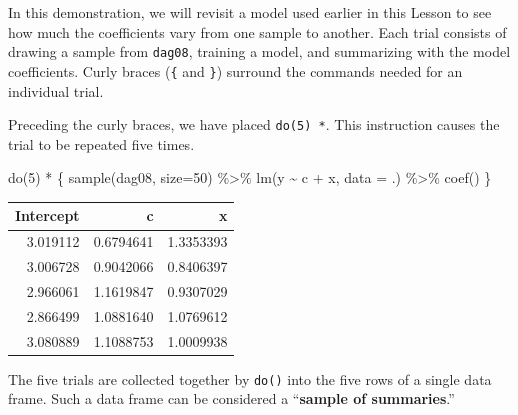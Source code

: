 \documentclass[
  letterpaper,
  DIV=11,
  numbers=noendperiod,
  oneside]{scrreprt}
\newenvironment{Shaded}{\begin{snugshade}}{\end{snugshade}}
\newcommand{\AttributeTok}[1]{\textcolor[rgb]{0.40,0.45,0.13}{#1}}
\newcommand{\DecValTok}[1]{\textcolor[rgb]{0.68,0.00,0.00}{#1}}
\newcommand{\FunctionTok}[1]{\textcolor[rgb]{0.28,0.35,0.67}{#1}}
\newcommand{\NormalTok}[1]{\textcolor[rgb]{0.00,0.23,0.31}{#1}}
\newcommand{\SpecialCharTok}[1]{\textcolor[rgb]{0.37,0.37,0.37}{#1}}
\begin{document}
\begin{tcolorbox}[enhanced jigsaw, colbacktitle=quarto-callout-warning-color!10!white, breakable, opacitybacktitle=0.6, colback=white, left=2mm, arc=.35mm, colframe=quarto-callout-warning-color-frame, coltitle=black, toprule=.15mm, opacityback=0, leftrule=.75mm, bottomtitle=1mm, toptitle=1mm, titlerule=0mm, title=\textcolor{quarto-callout-warning-color}{\faExclamationTriangle}\hspace{0.5em}{Demonstration: Conducting many trials with \texttt{do()}}, rightrule=.15mm, bottomrule=.15mm]

In this demonstration, we will revisit a model used earlier in this
Lesson to see how much the coefficients vary from one sample to another.
Each trial consists of drawing a sample from \texttt{dag08}, training a
model, and summarizing with the model coefficients. Curly braces
(\texttt{\{} and \texttt{\}}) surround the commands needed for an
individual trial.

Preceding the curly braces, we have placed \texttt{do(5)\ *}. This
instruction causes the trial to be repeated five times.

\begin{Shaded}
\begin{Highlighting}[]
\FunctionTok{do}\NormalTok{(}\DecValTok{5}\NormalTok{) }\SpecialCharTok{*}\NormalTok{ \{}
  \FunctionTok{sample}\NormalTok{(dag08, }\AttributeTok{size=}\DecValTok{50}\NormalTok{) }\SpecialCharTok{\%\textgreater{}\%} 
    \FunctionTok{lm}\NormalTok{(y }\SpecialCharTok{\textasciitilde{}}\NormalTok{ c }\SpecialCharTok{+}\NormalTok{ x, }\AttributeTok{data =}\NormalTok{ .) }\SpecialCharTok{\%\textgreater{}\%}
    \FunctionTok{coef}\NormalTok{()}
\NormalTok{\}}
\end{Highlighting}
\end{Shaded}

\ttfamily 
\begin{tabular}{rrr}
\toprule
Intercept & c & x\\
\midrule
3.019112 & 0.6794641 & 1.3353393\\
3.006728 & 0.9042066 & 0.8406397\\
2.966061 & 1.1619847 & 0.9307029\\
2.866499 & 1.0881640 & 1.0769612\\
3.080889 & 1.1088753 & 1.0009938\\
\bottomrule
\end{tabular} \normalfont
\bigskip

The five trials are collected together by \texttt{do()} into the five
rows of a single data frame. Such a data frame can be considered a
``\textbf{sample of summaries}.''

\end{tcolorbox}
\end{document}
